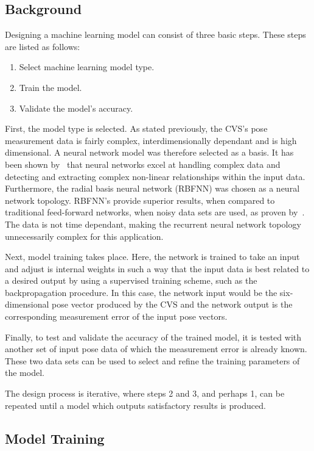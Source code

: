 \subsection{Background}

Designing a machine learning model can consist of three basic steps. These steps are listed as follows:

\begin{enumerate}
  \item Select machine learning model type.
  \item Train the model.
  \item Validate the model's accuracy. 
\end{enumerate}

First, the model type is selected. As stated previously, the CVS's pose measurement data is fairly complex, interdimensionally dependant and is high dimensional. A neural network model was therefore selected as a basis. It has been shown by~\cite{tu1996advantages} that neural networks excel at handling complex data and detecting and extracting complex non-linear relationships within the input data. Furthermore, the radial basis neural network (RBFNN) was chosen as a neural network topology. RBFNN's provide superior results, when compared to traditional feed-forward networks, when noisy data sets are used, as proven by~\cite{xie2011comparison}. The data is not time dependant, making the recurrent neural network topology unnecessarily complex for this application.  

Next, model training takes place. Here, the network is trained to take an input and adjust is internal weights in such a way that the input data is best related to a desired output by using a supervised training scheme, such as the backpropagation procedure. In this case, the network input would be the six-dimensional pose vector produced by the CVS and the network output is the corresponding measurement error of the input pose vectors.  

Finally, to test and validate the accuracy of the trained model, it is tested with another set of input pose data of which the measurement error is already known. These two data sets can be used to select and refine the training parameters of the model. 

The design process is iterative, where steps 2 and 3, and perhaps 1, can be repeated until a model which outputs satisfactory results is produced. 

\subsection{Model Training}

